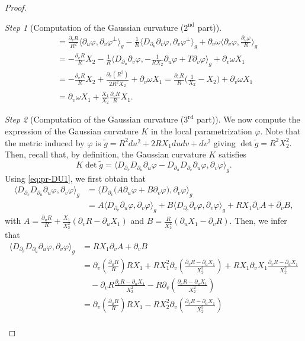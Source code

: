 \documentclass{article}
\newcommand{\DU}{\partial_{u}}
\newcommand{\DV}{\partial_{v}}
\theoremstyle{remark}
\theoremstyle{prpart}
\newtheorem{proofpart}{Step}
\newcommand{\PU}{\partial_{u}\varphi}
\newcommand{\PV}{\partial_{v}\varphi}
\newcommand{\NPU}{{\textstyle\frac{\partial_{u}\varphi}{R}}}
\begin{document}
\begin{proof}
\begin{proofpart}[Computation of the Gaussian curvature ($2^{\text{nd}}$ part)]
\begin{align*}
    &= \frac{\DV R}{R^2}\big\langle\PU,\PV^\perp\big\rangle_g - \frac{1}{R} \big\langle D_{\partial_u}\PV,\PV^\perp\big\rangle_g + \DV\omega\big\langle\PV,\NPU\big\rangle_g \\
                   &=-\frac{\DV R}{R}X_2-\frac{1}{R}\big\langle D_{\partial_u}\PV,-\frac{1}{RX_2}\PU+T\PV\big\rangle_g + \DV\omega X_1 \\
                   &= - \frac{\DV R}{R}X_2 +  \frac{\DV(R^2)}{2R^2X_2} + \DV\omega X_1 = \frac{\DV R}{R}\big(\frac{1}{X_2}-X_2\big)  + \DV\omega X_1\\
  &=\DV\omega X_1 + \frac{X_1}{X_2} \frac{\DV R}{R}X_1.
\end{align*}
\end{proofpart}


\begin{proofpart}[Computation of the Gaussian curvature ($3^{\text{rd}}$ part)]\label{step:gauss-curv3}
  We now compute the expression of the Gaussian curvature $K$ in the local parametrization $\varphi$. Note that the metric induced by $\varphi$ is $\tilde g = R^2du^2 + 2RX_1 dudv + dv^2$ giving $\det\tilde g = R^2X_2^2$. Then, recall that, by definition, the Gaussian curvature $K$ satisfies
\begin{equation}\label{eq:def-gauss-curv}
K\det \tilde g = \big\langle D_{\partial_v}D_{\partial_u}\PU - D_{\partial_u}D_{\partial_v}\PU,\PV\big\rangle_g.
\end{equation}
Using \eqref{eq:pr-DU1}, we first obtain that
\begin{align*}
  \big\langle D_{\partial_v}D_{\partial_u}\PU,\PV\big\rangle_g &= \big\langle D_{\partial_v}\big(A\PU+B\PV\big),\PV\big\rangle_g\\
  &=A \big\langle D_{\DV}\PU,\PV\big\rangle_g + B\langle D_{\DV}\PV,\PV\big\rangle_g + RX_1\DV A  + \DV B, 
\end{align*}
with $A=\frac{\DU R}{R}+\frac{X_1}{X_2^2}(\DV R-\DU X_{1})$ and $B = \frac{R}{X_2^2}(\DU X_{1}-\DV R)$. Then, we infer that
\small
\begin{align*}
 \big\langle D_{\partial_v}D_{\partial_u}\PU,\PV\big\rangle_g &= RX_1\DV A  + \DV B \\
 &= \DV\left(\frac{\DU R}{R}\right)RX_1
 +RX_1^2\DV\left(\frac{\DV R-\DU X_{1}}{X_2^2}\right) + RX_1\DV X_{1}\frac{\DV R-\DU X_{1}}{X_2^2}\\
 &\quad - \DV R\frac{\DV R-\DU X_{1}}{X_2^2}-R\DV\left(\frac{\DV R-\DU X_{1}}{X_2^2}\right)\\
                                                              &=\DV\left(\frac{\DU R}{R}\right)RX_1 -RX_2^2\DV\left(\frac{\DV R-\DU X_{1}}{X_2^2}\right) \\

\end{align*}
\end{proofpart}
\end{proof}
\end{document}
